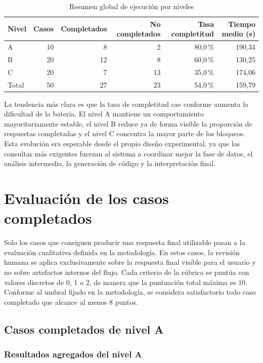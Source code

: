 \begin{table}[H]
\centering
\small
\setlength{\tabcolsep}{8pt}
\begin{tabular}{lrrrrr}
\toprule
Nivel & Casos & Completados & No completados & Tasa completitud & Tiempo medio (s) \\
\midrule
A & 10 & 8 & 2 & 80,0\,\% & 190,34 \\
B & 20 & 12 & 8 & 60,0\,\% & 130,25 \\
C & 20 & 7 & 13 & 35,0\,\% & 174,06 \\
Total & 50 & 27 & 23 & 54,0\,\% & 159,79 \\
\bottomrule
\end{tabular}
\caption{Resumen global de ejecuci\'on por niveles}
\label{tab:resumen-global-niveles}
\end{table}

La tendencia m\'as clara es que la tasa de completitud cae conforme aumenta la dificultad de la bater\'ia. El nivel A 
mantiene un comportamiento mayoritariamente estable, el nivel B reduce ya de forma visible la proporci\'on de respuestas 
completadas y el nivel C concentra la mayor parte de los bloqueos. Esta evoluci\'on era esperable desde el propio dise\~no 
experimental, ya que las consultas m\'as exigentes fuerzan al sistema a coordinar mejor la fase de datos, el an\'alisis 
intermedio, la generaci\'on de c\'odigo y la interpretaci\'on final.

\section{Evaluaci\'on de los casos completados}

Solo los casos que consiguen producir una respuesta final utilizable pasan a la evaluaci\'on cualitativa definida en la 
metodolog\'ia. En estos casos, la revisi\'on humana se aplica exclusivamente sobre la respuesta final visible para el 
usuario y no sobre artefactos internos del flujo. Cada criterio de la r\'ubrica se punt\'ua con valores discretos de 0, 1 o 
2, de manera que la puntuaci\'on total m\'axima es 10. Conforme al umbral fijado en la metodolog\'ia, se considera 
satisfactorio todo caso completado que alcance al menos 8 puntos.

\subsection{Casos completados de nivel A}

\subsubsection{Resultados agregados del nivel A}

